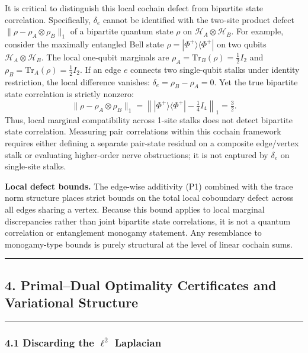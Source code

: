 \documentclass[
]{article}
\begin{document}
It is critical to distinguish this local cochain defect from bipartite state correlation. Specifically, \(\delta_e\) cannot be identified with the two-site product defect \(\|\rho - \rho_A \otimes \rho_B\|_1\) of a bipartite quantum state \(\rho\) on \(\mathcal{H}_A \otimes \mathcal{H}_B\). For example, consider the maximally entangled Bell state \(\rho = |\Phi^+\rangle\langle\Phi^+|\) on two qubits \(\mathcal{H}_A \otimes \mathcal{H}_B\). The local one-qubit marginals are \(\rho_A = \mathrm{Tr}_B(\rho) = \tfrac{1}{2} I_2\) and \(\rho_B = \mathrm{Tr}_A(\rho) = \tfrac{1}{2} I_2\). If an edge \(e\) connects two single-qubit stalks under identity restriction, the local difference vanishes: \(\delta_e = \rho_B - \rho_A = 0\). Yet the true bipartite state correlation is strictly nonzero:
\[\|\rho - \rho_A \otimes \rho_B\|_1 = \left\| |\Phi^+\rangle\langle\Phi^+| - \tfrac{1}{4} I_4 \right\|_1 = \tfrac{3}{2}.\]
Thus, local marginal compatibility across 1-site stalks does not detect bipartite state correlation. Measuring pair correlations within this cochain framework requires either defining a separate pair-state residual on a composite edge/vertex stalk or evaluating higher-order nerve obstructions; it is not captured by \(\delta_e\) on single-site stalks.

\textbf{Local defect bounds.} The edge-wise additivity (P1) combined with the trace norm structure places strict bounds on the total local coboundary defect across all edges sharing a vertex. Because this bound applies to local marginal discrepancies rather than joint bipartite state correlations, it is not a quantum correlation or entanglement monogamy statement. Any resemblance to monogamy-type bounds is purely structural at the level of linear cochain sums.

\begin{center}\rule{0.5\linewidth}{0.5pt}\end{center}

\subsection{4. Primal--Dual Optimality Certificates and Variational Structure}\label{primaldual-optimality-certificates-and-variational-structure}

\begin{center}\rule{0.5\linewidth}{0.5pt}\end{center}

\subsubsection{\texorpdfstring{4.1 Discarding the \(\ell^2\) Laplacian}{4.1 Discarding the \textbackslash ell\^{}2 Laplacian}}\label{discarding-the-ell2-laplacian}
\end{document}
